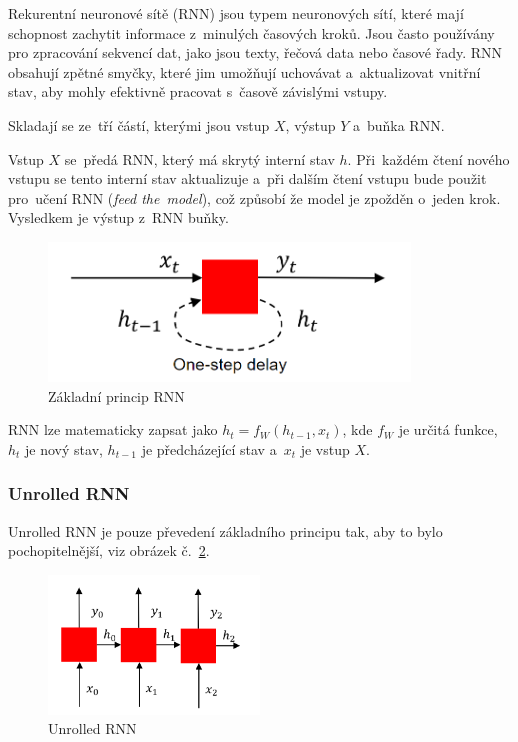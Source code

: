 Rekurentní neuronové sítě (RNN) jsou typem neuronových sítí, které mají schopnost zachytit informace z~minulých časových kroků. Jsou často používány pro zpracování sekvencí dat, jako jsou texty, řečová data nebo časové řady. RNN obsahují zpětné smyčky, které jim umožňují uchovávat a~aktualizovat vnitřní stav, aby mohly efektivně pracovat s~časově závislými vstupy.

Skladají se ze~tří částí, kterými jsou vstup $X$, výstup $Y$ a~buňka RNN.

Vstup $X$ se~předá RNN, který má skrytý interní stav $h$.
Při~každém čtení nového vstupu se tento interní stav aktualizuje a~při dalším čtení vstupu bude  použit pro~učení RNN (\emph{feed the~model}), což způsobí že model je zpožděn o~jeden krok.
Vysledkem je výstup z~RNN buňky.

\begin{figure}[h]
    \centering
    \includegraphics[height=10em]{images/09_RNN.png}
    \caption{Základní princip RNN}
    \label{RNN}
\end{figure}

RNN lze matematicky zapsat jako $h_t = f_W(h_{t-1},x_t)$, kde $f_W$ je určitá funkce, $h_t$ je nový stav, $h_{t-1}$ je předcházející stav a~$x_t$ je vstup $X$.

\subsubsection{Unrolled RNN}

Unrolled RNN je pouze převedení základního principu tak, aby to bylo pochopitelnější, viz obrázek č.~\ref{unrolledRNN}.

\begin{figure}[h]
    \centering
    \includegraphics[height=10em]{images/09_unrolled-RNN.png}
    \caption{Unrolled RNN}
    \label{unrolledRNN}
\end{figure}

